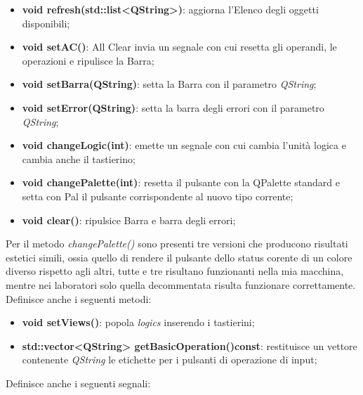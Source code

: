 \documentclass[a4paper,10pt]{article}
\begin{document}
        \begin{itemize}
            \item \textbf{void refresh(std::list<QString>)}: aggiorna l'Elenco degli oggetti disponibili;
            \item \textbf{void setAC()}: All Clear invia un segnale con cui resetta gli operandi, le operazioni e ripulisce la Barra;
            \item \textbf{void setBarra(QString)}: setta la Barra con il parametro \textit{QString};
            \item \textbf{void setError(QString)}: setta la barra degli errori con il parametro \textit{QString};
            \item \textbf{void changeLogic(int)}: emette un segnale con cui cambia l'unità logica e cambia anche il tastierino;
            \item \textbf{void changePalette(int)}: resetta il pulsante con la QPalette standard e setta con Pal il pulsante corrispondente al nuovo tipo corrente;
            \item \textbf{void clear()}: ripulsice Barra e barra degli errori;
        \end{itemize}
        Per il metodo \textit{changePalette()} sono presenti tre versioni che producono risultati estetici simili, ossia quello di rendere il pulsante dello status corente di un colore diverso rispetto agli altri, tutte e tre risultano funzionanti nella mia macchina, mentre nei laboratori solo quella decommentata risulta funzionare correttamente.
        Definisce anche i seguenti metodi:
        \begin{itemize}
            \item \textbf{void setViews()}: popola \textit{logics} inserendo i tastierini;
            \item \textbf{std::vector<QString> getBasicOperation()const}: restituisce un vettore contenente \textit{QString} le etichette per i pulsanti di operazione di input;
        \end{itemize}
        Definisce anche i seguenti segnali:
\end{document}
